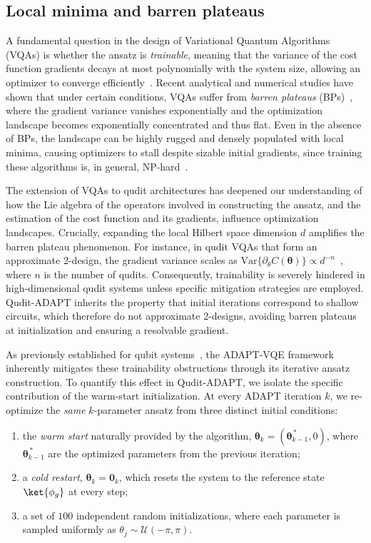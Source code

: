 \subsection{Local minima and barren plateaus}

A fundamental question in the design of Variational Quantum Algorithms (VQAs) is whether the ansatz is \textit{trainable}, meaning that the variance of the cost function gradients decays at most polynomially with the system size, allowing an optimizer to converge efficiently~\cite{LaroccaNatRevPhys2025}. Recent analytical and numerical studies have shown that under certain conditions, VQAs suffer from \textit{barren plateaus} (BPs)~\cite{LaroccaNatRevPhys2025, HolmesPRXQuantum2022}, where the gradient variance vanishes exponentially and the optimization landscape becomes exponentially concentrated and thus flat. Even in the absence of BPs, the landscape can be highly rugged and densely populated with local minima, causing optimizers to stall despite sizable initial gradients, since training these algorithms is, in general, NP-hard~\cite{BittelPRL2021}.

The extension of VQAs to qudit architectures has deepened our understanding of how the Lie algebra of the operators involved in constructing the ansatz, and the estimation of the cost function and its gradients, influence optimization landscapes. Crucially, expanding the local Hilbert space dimension $d$ amplifies the barren plateau phenomenon. For instance, in qudit VQAs that form an approximate 2-design, the gradient variance scales as $\mathrm{Var}\{\partial_{\theta} C(\boldsymbol{\theta})\} \propto d^{-n}$~\cite{FriedrichQMI2025}, where $n$ is the number of qudits. Consequently, trainability is severely hindered in high-dimensional qudit systems unless specific mitigation strategies are employed. Qudit-ADAPT inherits the property that initial iterations correspond to shallow circuits, which therefore do not approximate 2-designs, avoiding barren plateaus at initialization and ensuring a resolvable gradient.

As previously established for qubit systems~\cite{GrimsleynpjQuantumInf2023}, the ADAPT-VQE framework inherently mitigates these trainability obstructions through its iterative ansatz construction. To quantify this effect in Qudit-ADAPT, we isolate the specific contribution of the warm-start initialization. At every ADAPT iteration $k$, we re-optimize the \emph{same} $k$-parameter ansatz from three distinct initial conditions:

\begin{enumerate}
    \item the \emph{warm start} naturally provided by the algorithm, $\boldsymbol{\theta}_k = (\boldsymbol{\theta}_{k-1}^{\,*}, 0)$, where $\boldsymbol{\theta}_{k-1}^{\,*}$ are the optimized parameters from the previous iteration;
    \item a \emph{cold restart}, $\boldsymbol{\theta}_k = \boldsymbol{0}_k$, which resets the system to the reference state $\ket{\phi_g}$ at every step;
    \item a set of $100$ independent random initializations, where each parameter is sampled uniformly as $\theta_j \sim \mathcal{U}(-\pi,\pi)$.
\end{enumerate}

